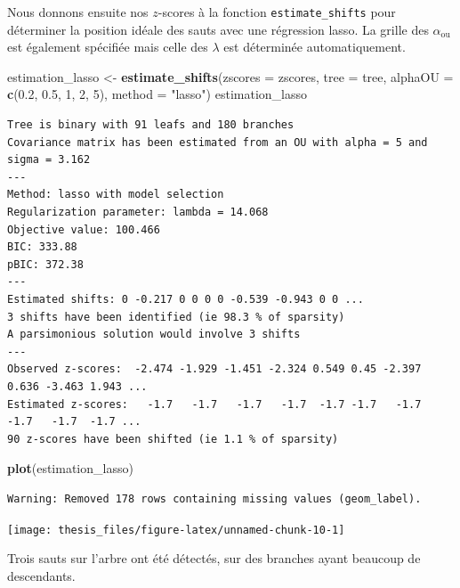 \documentclass[12pt,a4paper]{reedthesis}
\newenvironment{Shaded}{\begin{snugshade}}{\end{snugshade}}
\newcommand{\DataTypeTok}[1]{\textcolor[rgb]{0.13,0.29,0.53}{#1}}
\newcommand{\DecValTok}[1]{\textcolor[rgb]{0.00,0.00,0.81}{#1}}
\newcommand{\FloatTok}[1]{\textcolor[rgb]{0.00,0.00,0.81}{#1}}
\newcommand{\KeywordTok}[1]{\textcolor[rgb]{0.13,0.29,0.53}{\textbf{#1}}}
\newcommand{\NormalTok}[1]{#1}
\newcommand{\StringTok}[1]{\textcolor[rgb]{0.31,0.60,0.02}{#1}}
\newcommand \ou [1]{{#1}_{\text{ou}}}
\theoremstyle{definition}
\theoremstyle{definition}
\theoremstyle{definition}
\theoremstyle{remark}
\begin{document}
Nous donnons ensuite nos \(z\)-scores à la fonction \texttt{estimate\_shifts} pour déterminer la position idéale des sauts avec une régression lasso. La grille des \(\ou{\alpha}\) est également spécifiée mais celle des \(\lambda\) est déterminée automatiquement.
\begin{Shaded}
\begin{Highlighting}[]
\NormalTok{estimation_lasso <-}\StringTok{ }\KeywordTok{estimate_shifts}\NormalTok{(}\DataTypeTok{zscores =}\NormalTok{ zscores, }\DataTypeTok{tree =}\NormalTok{ tree, }
                                    \DataTypeTok{alphaOU =} \KeywordTok{c}\NormalTok{(}\FloatTok{0.2}\NormalTok{, }\FloatTok{0.5}\NormalTok{, }\DecValTok{1}\NormalTok{, }\DecValTok{2}\NormalTok{, }\DecValTok{5}\NormalTok{),}
                                    \DataTypeTok{method =} \StringTok{"lasso"}\NormalTok{)}
\NormalTok{estimation_lasso}
\end{Highlighting}
\end{Shaded}
\begin{verbatim}
Tree is binary with 91 leafs and 180 branches
Covariance matrix has been estimated from an OU with alpha = 5 and sigma = 3.162 
---
Method: lasso with model selection
Regularization parameter: lambda = 14.068 
Objective value: 100.466
BIC: 333.88
pBIC: 372.38
---
Estimated shifts: 0 -0.217 0 0 0 0 -0.539 -0.943 0 0 ...
3 shifts have been identified (ie 98.3 % of sparsity)
A parsimonious solution would involve 3 shifts
---
Observed z-scores:  -2.474 -1.929 -1.451 -2.324 0.549 0.45 -2.397 0.636 -3.463 1.943 ...
Estimated z-scores:   -1.7   -1.7   -1.7   -1.7  -1.7 -1.7   -1.7  -1.7   -1.7  -1.7 ...
90 z-scores have been shifted (ie 1.1 % of sparsity)
\end{verbatim}
\begin{Shaded}
\begin{Highlighting}[]
\KeywordTok{plot}\NormalTok{(estimation_lasso)}
\end{Highlighting}
\end{Shaded}
\begin{verbatim}
Warning: Removed 178 rows containing missing values (geom_label).
\end{verbatim}
\begin{center}\texttt{[image: thesis\_files/figure-latex/unnamed-chunk-10-1]} \end{center}

Trois sauts sur l'arbre ont été détectés, sur des branches ayant beaucoup de descendants.
\end{document}
